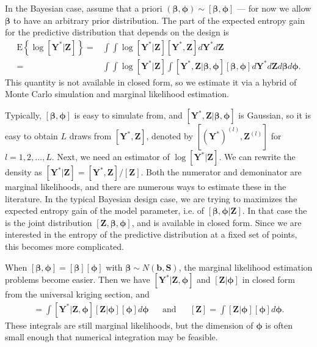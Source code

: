 \documentclass[12pt]{article}
\newcommand{\E}{\mathrm{E}}
\begin{document}
In the Bayesian case, assume that a priori $(\bm{\beta},\bm{\phi})\sim [\bm{\beta},\bm{\phi}]$ --- for now we allow $\bm{\beta}$ to have an arbitrary prior distribution. The part of the expected entropy gain for the predictive distribution that depends on the design is
\begin{align*}
\E\left\{\log[\bm{Y}^*|\bm{Z}]\right\} =& \int \int \log[\bm{Y}^*|\bm{Z}] [\bm{Y}^*,\bm{Z}]d\bm{Y}^*d\bm{Z}\\ 
=& \int\int\log[\bm{Y}^*|\bm{Z}]\int[\bm{Y}^*,\bm{Z}|\bm{\beta},\bm{\phi}][\bm{\beta},\bm{\phi}]d\bm{Y}^*d\bm{Z}d\bm{\beta}d\bm{\phi}.
\end{align*}
This quantity is not available in closed form, so we estimate it via a hybrid of Monte Carlo simulation and marginal likelihood estimation. 

Typically, $[\bm{\beta},\bm{\phi}]$ is easy to simulate from, and $[\bm{Y}^*,\bm{Z}|\bm{\beta},\bm{\phi}]$ is Gaussian, so it is easy to obtain $L$ draws from $[\bm{Y}^*,\bm{Z}]$, denoted by $[(\bm{Y}^*)^{(l)}, \bm{Z}^{(l)}]$ for $l=1,2,\dots,L$. Next, we need an estimator of $\log[\bm{Y}^*|\bm{Z}]$. We can rewrite the density as $[\bm{Y}^*|\bm{Z}] = [\bm{Y}^*,\bm{Z}]/[\bm{Z}]$. Both the numerator and demoninator are marginal likelihoods, and there are numerous ways to estimate these in the literature. In the typical Bayesian design case, we are trying to maximizes the expected entropy gain of the model parameter, i.e. of $[\bm{\beta},\bm{\phi}|\bm{Z}]$. In that case the is the joint distribution $[\bm{Z},\bm{\beta},\bm{\phi}]$, and is available in closed form. Since we are interested in the entropy of the predictive distribution at a fixed set of points, this becomes more complicated.

When $[\bm{\beta},\bm{\phi}]=[\bm{\beta}][\bm{\phi}]$ with $\bm{\beta}\sim N(\bm{b},\bm{S})$, the marginal likelihood estimation problems become easier. Then we have $[\bm{Y}^*|\bm{Z},\bm{\phi}]$ and $[\bm{Z}|\bm{\phi}]$ in closed form from the universal kriging section, and  
\begin{align*}
[\bm{Y}^*,\bm{Z}] = \int[\bm{Y}^*|\bm{Z},\bm{\phi}][\bm{Z}|\bm{\phi}][\bm{\phi}]d\bm{\phi} &&\mbox{and}&&[\bm{Z}] = \int[\bm{Z}|\bm{\phi}][\bm{\phi}]d\bm{\phi}.
\end{align*}
These integrals are still marginal likelihoods, but the dimension of $\bm{\phi}$ is often small enough that numerical integration may be feasible.


\clearpage\pagebreak\newpage\thispagestyle{empty}
%
\end{document}
